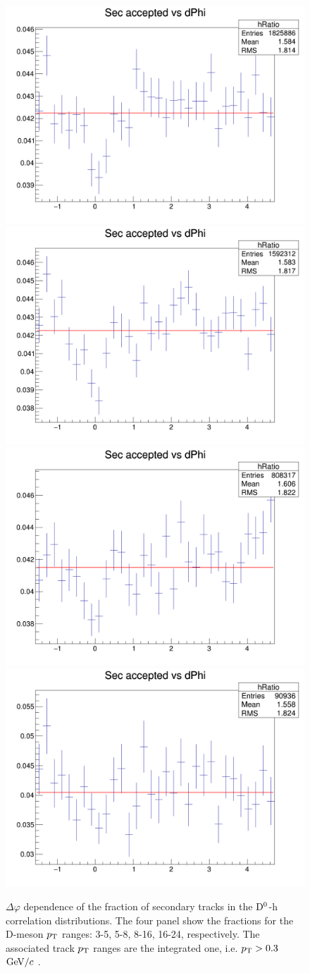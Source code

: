 \begin{figure}[h]   %
	\centering
	\includegraphics[width=.48\linewidth]{figures/SecTracks/DeltaPhi_3to5_03to99_RatioSecOverAll.png}
	\includegraphics[width=.48\linewidth]{figures/SecTracks/DeltaPhi_5to8_03to99_RatioSecOverAll.png}
    \includegraphics[width=.48\linewidth]{figures/SecTracks/DeltaPhi_8to16_03to99_RatioSecOverAll.png}
    \includegraphics[width=.48\linewidth]{figures/SecTracks/DeltaPhi_16to24_03to99_RatioSecOverAll.png}
	\caption{$\Delta\varphi$ dependence of the fraction of secondary tracks in the ${\rm D^0}$-h correlation distributions. The four panel show the fractions for the D-meson $p_{\rm T}$ ranges: 3-5, 5-8, 8-16, 16-24, respectively. The associated track $p_{\rm T}$ ranges are the integrated one, i.e. $p_{\rm T} > 0.3$ $\mathrm{GeV}/c$ .}
	\label{fig:secdPhi}	
\end{figure}

